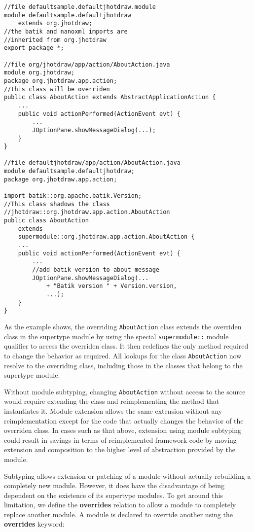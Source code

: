 \begin{lstlisting}[caption=Module Subtyping]
//file defaultsample.defaultjhotdraw.module 
module defaultsample.defaultjhotdraw 
	extends org.jhotdraw;
//the batik and nanoxml imports are 
//inherited from org.jhotdraw
export package *;

//file org/jhotdraw/app/action/AboutAction.java
module org.jhotdraw;
package org.jhotdraw.app.action;
//this class will be overriden
public class AboutAction extends AbstractApplicationAction {
	...
	public void actionPerformed(ActionEvent evt) {
		...
		JOptionPane.showMessageDialog(...);
	}
}

//file defaultjhotdraw/app/action/AboutAction.java
module defaultsample.defaultjhotdraw;
package org.jhotdraw.app.action;

import batik::org.apache.batik.Version;
//This class shadows the class
//jhotdraw::org.jhotdraw.app.action.AboutAction
public class AboutAction 
	extends 
	supermodule::org.jhotdraw.app.action.AboutAction {
	...
	public void actionPerformed(ActionEvent evt) {
		...
		//add batik version to about message
		JOptionPane.showMessageDialog(...
			+ "Batik version " + Version.version,
			...);
	}
}

\end{lstlisting}

As the example shows, the overriding \texttt{AboutAction} class extends the
overriden class in the supertype module by using the special 
\texttt{supermodule::} module qualifier to access the overriden class. It
then redefines the only method required to change the behavior as required.
All lookups for the class \texttt{AboutAction} now resolve to the overriding
class, including those in the classes that belong to the supertype module.

Without module subtyping, changing \texttt{AboutAction} without access to the source
would require extending the class and reimplementing the method 
that instantiates it. Module extension allows the same extension without
any reimplementation except for the code that actually changes the behavior of the overriden class.
In cases such as that above, extension using module subtyping could result in savings in
terms of reimplemented framework code by moving extension and
composition to the higher level of abstraction provided by the module.


Subtyping allows extension or patching of a module without actually
rebuilding a completely new module. However, it does have the disadvantage
of being dependent on the existence of its supertype modules. To get
around this limitation, we define the \textbf{overrides} relation to allow
a module to completely replace another module. A module is declared
to override another using the \textbf{overrides} keyword:

